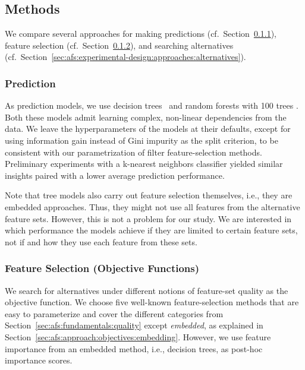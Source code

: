 \documentclass{article}
\theoremstyle{definition}
\begin{document}
\subsection{Methods}
\label{sec:afs:experimental-design:approaches}

We compare several approaches for making predictions (cf.~Section~\ref{sec:afs:experimental-design:approaches:prediction}), feature selection (cf.~Section~\ref{sec:afs:experimental-design:approaches:feature-selection}), and searching alternatives (cf.~Section~\ref{sec:afs:experimental-design:approaches:alternatives}).

\subsubsection{Prediction}
\label{sec:afs:experimental-design:approaches:prediction}

As prediction models, we use decision trees~\cite{breiman1984classification} and random forests with 100 trees \cite{breiman2001random}.
Both these models admit learning complex, non-linear dependencies from the data.
We leave the hyperparameters of the models at their defaults, except for using information gain instead of Gini impurity as the split criterion, to be consistent with our parametrization of filter feature-selection methods.
Preliminary experiments with a k-nearest neighbors classifier yielded similar insights paired with a lower average prediction performance.

Note that tree models also carry out feature selection themselves, i.e., they are embedded approaches.
Thus, they might not use all features from the alternative feature sets.
However, this is not a problem for our study.
We are interested in which performance the models achieve if they are limited to certain feature sets, not if and how they use each feature from these sets.

\subsubsection{Feature Selection (Objective Functions)}
\label{sec:afs:experimental-design:approaches:feature-selection}

We search for alternatives under different notions of feature-set quality as the objective function.
We choose five well-known feature-selection methods that are easy to parameterize and cover the different categories from Section~\ref{sec:afs:fundamentals:quality} except \emph{embedded}, as explained in Section~\ref{sec:afs:approach:objectives:embedding}.
However, we use feature importance from an embedded method, i.e., decision trees, as post-hoc importance scores.
\end{document}

